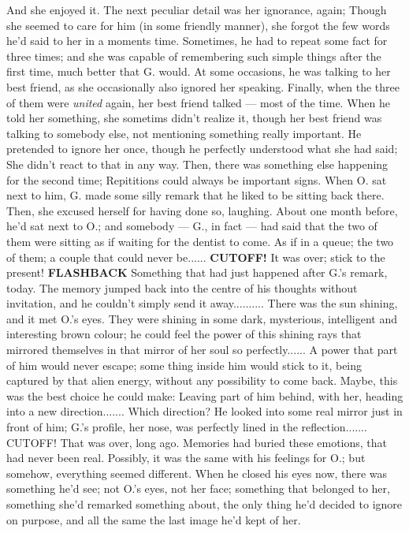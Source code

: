 And she enjoyed it. 
The next peculiar detail was her ignorance, again; Though she seemed to care for him (in some friendly manner), she forgot the few words he'd said to her in a moments time. 
Sometimes, he had to repeat some fact for three times; and she was capable of remembering such simple things after the first time, much better that G. would. 
At some occasions, he was talking to her best friend, as she occasionally also ignored her speaking. 
Finally, when the three of them were \emph{united} again, her best friend talked --- most of the time. When he told her something, she sometims didn't realize it, though her best friend was talking to somebody else, not mentioning something really important. 
He pretended to ignore her once, though he perfectly understood what she had said; She didn't react to that in any way. 
Then, there was something else happening for the second time; Repititions could always be important signs. 
When O. sat next to him, G. made some silly remark that he liked to be sitting back there. Then, she excused herself for having done so, laughing. 
About one month before, he'd sat next to O.; and somebody --- G., in fact --- had said that the two of them were sitting as if waiting for the dentist to come. 
As if in a queue; the two of them; a couple that could never be......
\textbf{CUTOFF!}
It was over; stick to the present!
\textbf{FLASHBACK}
Something that had just happened after G.'s remark, today. 
The memory jumped back into the centre of his thoughts without invitation, and he couldn't simply send it away..........
There was the sun shining, and it met O.'s eyes. 
They were shining in some dark, mysterious, intelligent and interesting brown colour; he could feel the power of this shining rays that mirrored themselves in that mirror of her soul so perfectly......
A power that part of him would never escape; some thing inside him would stick to it, being captured by that alien energy, without any possibility to come back. 
Maybe, this was the best choice he could make: Leaving part of him behind, with her, heading into a new direction.......
Which direction?
He looked into some real mirror just in front of him; G.'s profile, her nose, was perfectly lined in the reflection.......
CUTOFF!
That was over, long ago. 
Memories had buried these emotions, that had never been real. 
Possibly, it was the same with his feelings for O.; but somehow, everything seemed different. 
When he closed his eyes now, there was something he'd see; not O.'s eyes, not her face; something that belonged to her, something she'd remarked something about, the only thing he'd decided to ignore on purpose, and all the same the last image he'd kept of her. 
